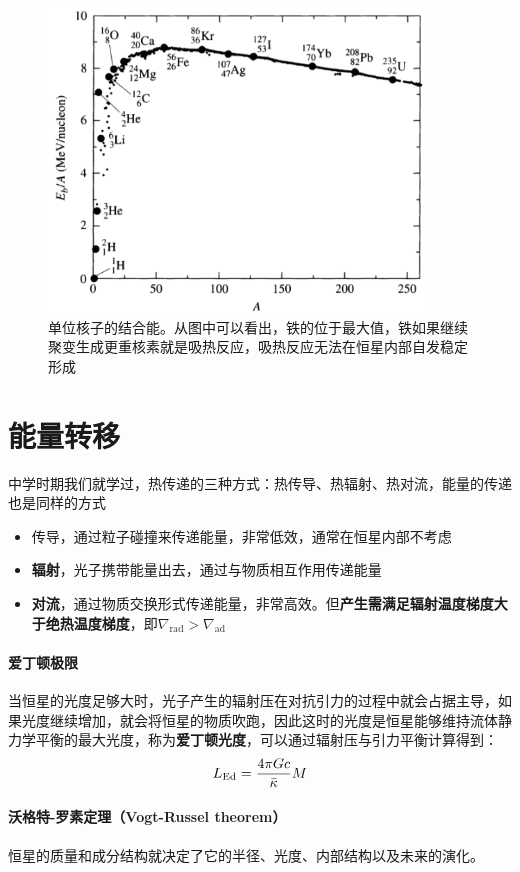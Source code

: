 \begin{figure}[hbt]
  \centering
  \includegraphics[width=10cm]{chapters/10/bindingenergy}
  \caption{单位核子的结合能。从图中可以看出，铁的位于最大值，铁如果继续聚变生成更重核素就是吸热反应，吸热反应无法在恒星内部自发稳定形成}
  \label{}
\end{figure}



\section{能量转移}
中学时期我们就学过，热传递的三种方式：热传导、热辐射、热对流，能量的传递也是同样的方式
\begin{itemize}
  \item 传导，通过粒子碰撞来传递能量，非常低效，通常在恒星内部不考虑
  \item \textbf{辐射}，光子携带能量出去，通过与物质相互作用传递能量
  \item \textbf{对流}，通过物质交换形式传递能量，非常高效。但\textbf{产生需满足辐射温度梯度大于绝热温度梯度}，即$\nabla_\mathrm{rad}>\nabla_\mathrm{ad}$
\end{itemize}

\paragraph{爱丁顿极限}
当恒星的光度足够大时，光子产生的辐射压在对抗引力的过程中就会占据主导，如果光度继续增加，就会将恒星的物质吹跑，因此这时的光度是恒星能够维持流体静力学平衡的最大光度，称为\textbf{爱丁顿光度}，可以通过辐射压与引力平衡计算得到：
\begin{equation}
  L_\mathrm{Ed}={4\pi Gc \over \bar\kappa}M
\end{equation}

\paragraph{沃格特-罗素定理（Vogt-Russel theorem）}
恒星的质量和成分结构就决定了它的半径、光度、内部结构以及未来的演化。
